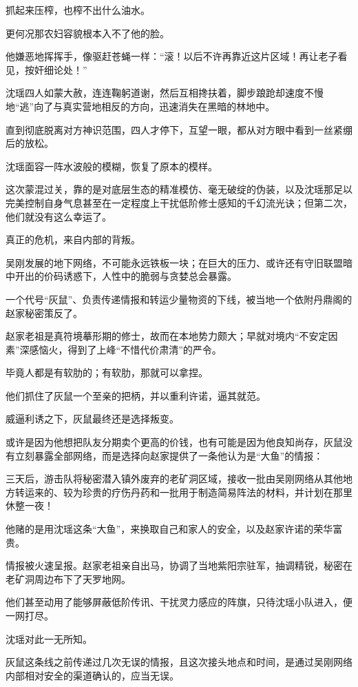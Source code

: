 抓起来压榨，也榨不出什么油水。

更何况那农妇容貌根本入不了他的脸。

他嫌恶地挥挥手，像驱赶苍蝇一样：“滚！以后不许再靠近这片区域！再让老子看见，按奸细论处！”

沈瑶四人如蒙大赦，连连鞠躬道谢，然后互相搀扶着，脚步踉跄却速度不慢地“逃”向了与真实营地相反的方向，迅速消失在黑暗的林地中。

直到彻底脱离对方神识范围，四人才停下，互望一眼，都从对方眼中看到一丝紧绷后的放松。

沈瑶面容一阵水波般的模糊，恢复了原本的模样。

这次蒙混过关，靠的是对底层生态的精准模仿、毫无破绽的伪装，以及沈瑶那足以完美控制自身气息甚至在一定程度上干扰低阶修士感知的千幻流光诀；但第二次，他们就没有这么幸运了。

\vspace{2em}

真正的危机，来自内部的背叛。

吴刚发展的地下网络，不可能永远铁板一块；在巨大的压力、或许还有守旧联盟暗中开出的价码诱惑下，人性中的脆弱与贪婪总会暴露。

一个代号“灰鼠”、负责传递情报和转运少量物资的下线，被当地一个依附丹鼎阁的赵家秘密策反了。

赵家老祖是真符境摹形期的修士，故而在本地势力颇大；早就对境内“不安定因素”深感恼火，得到了上峰“不惜代价肃清”的严令。

毕竟人都是有软肋的；有软肋，那就可以拿捏。

他们抓住了灰鼠一个至亲的把柄，并以重利许诺，逼其就范。

威逼利诱之下，灰鼠最终还是选择叛变。

或许是因为他想把队友分期卖个更高的价钱，也有可能是因为他良知尚存，灰鼠没有立刻暴露全部网络，而是选择向赵家提供了一条他认为是“大鱼”的情报：

三天后，游击队将秘密潜入镇外废弃的老矿洞区域，接收一批由吴刚网络从其他地方转运来的、较为珍贵的疗伤丹药和一批用于制造简易阵法的材料，并计划在那里休整一夜！

他赌的是用沈瑶这条“大鱼”，来换取自己和家人的安全，以及赵家许诺的荣华富贵。

情报被火速呈报。赵家老祖亲自出马，协调了当地紫阳宗驻军，抽调精锐，秘密在老矿洞周边布下了天罗地网。

他们甚至动用了能够屏蔽低阶传讯、干扰灵力感应的阵旗，只待沈瑶小队进入，便一网打尽。

沈瑶对此一无所知。

灰鼠这条线之前传递过几次无误的情报，且这次接头地点和时间，是通过吴刚网络内部相对安全的渠道确认的，应当无误。


